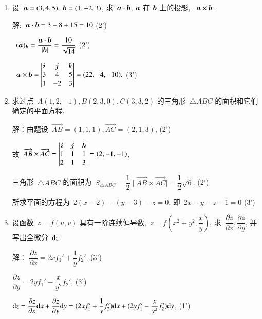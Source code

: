 \documentclass[twocolumn,landscape,fntef,UTF8]{ctexart}
\begin{document}
\begin{enumerate}%
		\item 设~$\boldsymbol{a}=(3,4,5),~\boldsymbol{b}=(1,-2,3)$, 求~$\boldsymbol{a}\cdot\boldsymbol{b}$, $\boldsymbol{a}$ 在 $ \boldsymbol{b}$ 上的投影, ~$\boldsymbol{a}\times\boldsymbol{b}$.
		\vspace{1cm}
		
		解:~$\boldsymbol{a}\cdot\boldsymbol{b} = 3-8+15=10$ \dotfill{}(2')
		
		~$(\boldsymbol{a})_{\boldsymbol{b}} = \dfrac{\boldsymbol{a}\cdot\boldsymbol{b}}{|\boldsymbol{b}|}=\dfrac{10}{\sqrt{14}}$ \dotfill{}(2')
		
		~$\boldsymbol{a}\times\boldsymbol{b} = \begin{vmatrix}
		\boldsymbol{i} & \boldsymbol{j} & \boldsymbol{k}\\
		3 & 4 & 5\\
		1 & -2 & 3\\
		\end{vmatrix}=(22,-4,-10).$ \dotfill{}(3')
\item  求过点~$A(1,2,-1), B(2,3,0),C(3,3,2)$ 的三角形~$\triangle ABC$ 的面积和它们确定的平面方程.

解：由题设~$\overrightarrow{AB}=(1,1,1),\overrightarrow{AC}=(2,1,3)$, \dotfill{}(2')

故~$\overrightarrow{AB}\times \overrightarrow{AC}=\begin{vmatrix}
\boldsymbol{i}&\boldsymbol{j} &\boldsymbol{k}\\
1&1&1\\
2&1&3\\
\end{vmatrix}=(2,-1,-1)$,

三角形~$\triangle ABC$ 的面积为~$S_{\triangle ABC}=\dfrac{1}{2}\mid\overrightarrow{AB}\times \overrightarrow{AC}\mid=\dfrac{1}{2}\sqrt{6}.$  \dotfill{}(2')

所求平面的方程为~$2(x-2)-(y-3)-z=0$, 即~$2x-y-z-1=0$
 \dotfill{}(3')			

\item 设函数~$z = f(u,v)$ 具有一阶连续偏导数,~$z = f(x^2+y^2,\dfrac{x}{y})$, 求~$\dfrac{\partial z}{\partial x}, \dfrac{\partial z}{\partial y}$, 并写出全微分~$\mathrm{d} z$.
			
解： $\dfrac{\partial z}{\partial x} = 2xf_1' + \dfrac{1}{y}f_2'$, \dotfill{}(3')
			
$\dfrac{\partial z}{\partial y} = 2y f_1' - \dfrac{x}{y^2}f_2'$, \dotfill{}(3')
			
$\mathrm{d} z =\dfrac{\partial z}{\partial x}\mathrm{d} x + \dfrac{\partial z}{\partial y} \mathrm{d} y\\	=(2xf_1' + \dfrac{1}{y}f_2')\mathrm{d} x +(2y f_1' - \dfrac{x}{y^2}f_2')\mathrm{d} y$, \dotfill{}(1')
\end{enumerate}
\vspace{2cm}
\end{document}
